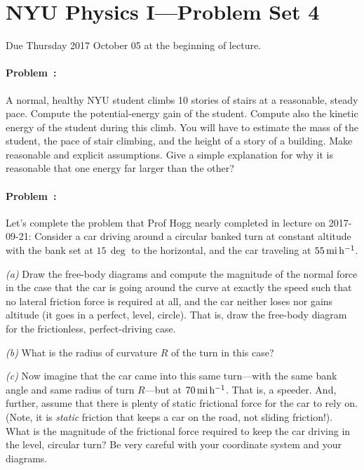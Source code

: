 \documentclass[12pt]{article}
\begin{document}
\section*{NYU Physics I---Problem Set 4}

Due Thursday 2017 October 05 at the beginning of lecture.

\paragraph{Problem~\theproblem:}%
A normal, healthy NYU student climbs 10 stories of stairs at a
reasonable, steady pace. Compute the potential-energy gain of the
student. Compute also the kinetic energy of the student during this
climb. You will have to estimate the mass of the student, the pace of
stair climbing, and the height of a story of a building. Make
reasonable and explicit assumptions. Give a simple explanation for why
it is reasonable that one energy far larger than the other?

\paragraph{Problem~\theproblem:}%
Let's complete the problem that Prof Hogg nearly completed in lecture
on 2017-09-21: Consider a car driving around a circular banked turn at
constant altitude with the bank set at $15\,\deg$ to the horizontal,
and the car traveling at $55\,\mathrm{mi}\,\mathrm{h}^{-1}$.

\textsl{(a)} Draw the free-body diagrams and compute the magnitude of
the normal force in the case that the car is going around the curve at
exactly the speed such that no lateral friction force is required at
all, and the car neither loses nor gains altitude (it goes in a
perfect, level, circle). That is, draw the free-body diagram for the
frictionless, perfect-driving case.

\textsl{(b)} What is the radius of curvature $R$ of the turn in this
case?

\textsl{(c)} Now imagine that the car came into this same turn---with
the same bank angle and same radius of turn $R$---but at
$70\,\mathrm{mi}\,\mathrm{h}^{-1}$. That is, a speeder. And, further, assume that there is
plenty of static frictional force for the car to rely on. (Note, it is
\emph{static} friction that keeps a car on the road, not sliding
friction!). What is the magnitude of the frictional force required to
keep the car driving in the level, circular turn? Be very careful with
your coordinate system and your diagrams.
\end{document}
